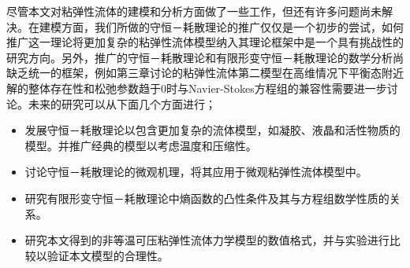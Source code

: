 尽管本文对粘弹性流体的建模和分析方面做了一些工作，但还有许多问题尚未解决。在建模方面，我们所做的守恒－耗散理论的推广仅仅是一个初步的尝试，如何推广这一理论将更加复杂的粘弹性流体模型纳入其理论框架中是一个具有挑战性的研究方向。另外，推广的守恒－耗散理论和有限形变守恒－耗散理论的数学分析尚缺乏统一的框架，例如第三章讨论的粘弹性流体第二模型在高维情况下平衡态附近解的整体存在性和松弛参数趋于$0$时与Navier-Stokes方程组的兼容性需要进一步讨论。未来的研究可以从下面几个方面进行；
\begin{itemize}
	\item 发展守恒－耗散理论以包含更加复杂的流体模型，如凝胶、液晶和活性物质的模型。并推广经典的模型以考虑温度和压缩性。
	\item 讨论守恒－耗散理论的微观机理，将其应用于微观粘弹性流体模型中。
	\item 研究有限形变守恒－耗散理论中熵函数的凸性条件及其与方程组数学性质的关系。
	\item 研究本文得到的非等温可压粘弹性流体力学模型的数值格式，并与实验进行比较以验证本文模型的合理性。
\end{itemize}

% 